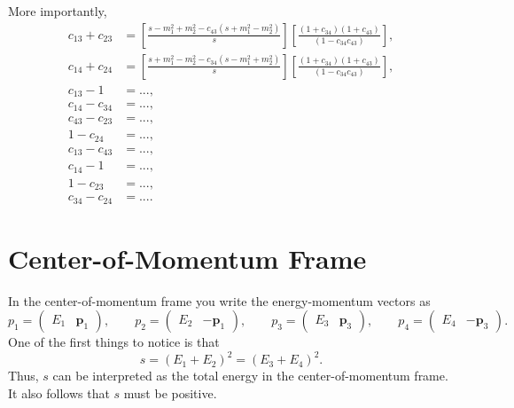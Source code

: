 More importantly,
\begin{align}
	c_{13} + c_{23} &= \left[ \frac{s - m_{1}^{2} + m_{2}^{2} - c_{43} \left( s + m_{1}^{2} - m_{2}^{2} \right)}{s} \right] \left[ \frac{\left(1 + c_{34} \right) \left(1 + c_{43} \right)}{\left(1 - c_{34} c_{43} \right)} \right], \\
	c_{14} + c_{24} &= \left[ \frac{s + m_{1}^{2} - m_{2}^{2} - c_{34} \left( s - m_{1}^{2} + m_{2}^{2} \right)}{s} \right] \left[ \frac{\left(1 + c_{34} \right) \left(1 + c_{43} \right)}{\left(1 - c_{34} c_{43} \right)} \right], \\
	c_{13} - 1 &= ..., \\
	c_{14} - c_{34} &= ..., \\
	c_{43} - c_{23} &= ..., \\
	1 - c_{24} &= ..., \\
	c_{13} - c_{43} &= ..., \\
	c_{14} - 1 &= ..., \\
	1 - c_{23} &= ..., \\
	c_{34} - c_{24} &= ....
\end{align}
\section{Center-of-Momentum Frame}
In the center-of-momentum frame you write the energy-momentum vectors as
\begin{equation}
	p_{1} = \begin{pmatrix} E_{1} & \mathbf{p}_{1} \end{pmatrix}, \qquad p_{2} = \begin{pmatrix} E_{2} & -\mathbf{p}_{1} \end{pmatrix}, \qquad p_{3} = \begin{pmatrix} E_{3} & \mathbf{p}_{3} \end{pmatrix}, \qquad p_{4} = \begin{pmatrix} E_{4} & -\mathbf{p}_{3} \end{pmatrix}.
\end{equation}
One of the first things to notice is that
\begin{equation}
	s = (E_{1} + E_{2})^{2} = (E_{3} + E_{4})^{2}.
\end{equation}
Thus, $s$ can be interpreted as the total energy in the center-of-momentum frame. It also follows that $s$ must be positive.

